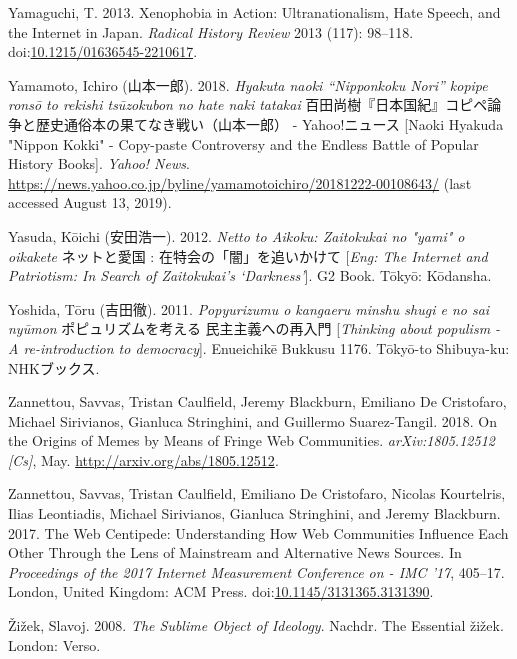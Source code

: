 \documentclass[10pt,british,A4paper,twoside]{memoir}
\begin{document}
\hypertarget{ref-yamaguchi_xenophobia_2013}{}
Yamaguchi, T. 2013. Xenophobia in Action: Ultranationalism, Hate Speech,
and the Internet in Japan. \emph{Radical History Review} 2013 (117):
98--118.
doi:\href{https://doi.org/10.1215/01636545-2210617}{10.1215/01636545-2210617}.

\hypertarget{ref-yamamoto__2018}{}
Yamamoto, Ichiro (山本一郎). 2018.
\emph{Hyakuta naoki “Nipponkoku Nori” kopipe ronsō to rekishi tsūzokubon no hate naki tatakai} 百田尚樹『日本国紀』コピペ論争と歴史通俗本の果てなき戦い（山本一郎） - Yahoo!ニュース [Naoki Hyakuda "Nippon Kokki" - Copy-paste Controversy and the Endless Battle of Popular History Books]. \emph{Yahoo! News}.
\url{https://news.yahoo.co.jp/byline/yamamotoichiro/20181222-00108643/} (last accessed August 13, 2019).

\hypertarget{ref-yasuda_eng:_2012}{}
Yasuda, Kōichi (安田浩一). 2012. \emph{Netto to Aikoku: Zaitokukai no "yami" o oikakete} ネットと愛国 : 在特会の「闇」を追いかけて [\emph{Eng: The Internet and Patriotism: In Search of Zaitokukai's `Darkness'}]. G2 Book. Tōkyō: Kōdansha.

\hypertarget{ref-yoshida__2011}{}
Yoshida, Tōru (吉田徹). 2011. \emph{Popyurizumu o kangaeru minshu shugi e no sai nyūmon} ポピュリズムを考える 民主主義への再入門 [\emph{Thinking about populism - A re-introduction to democracy}].
Enueichikē Bukkusu 1176. Tōkyō-to Shibuya-ku: NHKブックス.

\hypertarget{ref-zannettou_origins_2018}{}
Zannettou, Savvas, Tristan Caulfield, Jeremy Blackburn, Emiliano De
Cristofaro, Michael Sirivianos, Gianluca Stringhini, and Guillermo
Suarez-Tangil. 2018. On the Origins of Memes by Means of Fringe Web
Communities. \emph{arXiv:1805.12512 {[}Cs{]}}, May.
\url{http://arxiv.org/abs/1805.12512}.

\hypertarget{ref-zannettou_web_2017}{}
Zannettou, Savvas, Tristan Caulfield, Emiliano De Cristofaro, Nicolas
Kourtelris, Ilias Leontiadis, Michael Sirivianos, Gianluca Stringhini,
and Jeremy Blackburn. 2017. The Web Centipede: Understanding How Web
Communities Influence Each Other Through the Lens of Mainstream and
Alternative News Sources. In \emph{Proceedings of the 2017 Internet
Measurement Conference on - IMC '17}, 405--17. London, United Kingdom:
ACM Press.
doi:\href{https://doi.org/10.1145/3131365.3131390}{10.1145/3131365.3131390}.

\hypertarget{ref-zizek_sublime_2008}{}
Žižek, Slavoj. 2008. \emph{The Sublime Object of Ideology}. Nachdr. The
Essential žižek. London: Verso.
\end{document}
